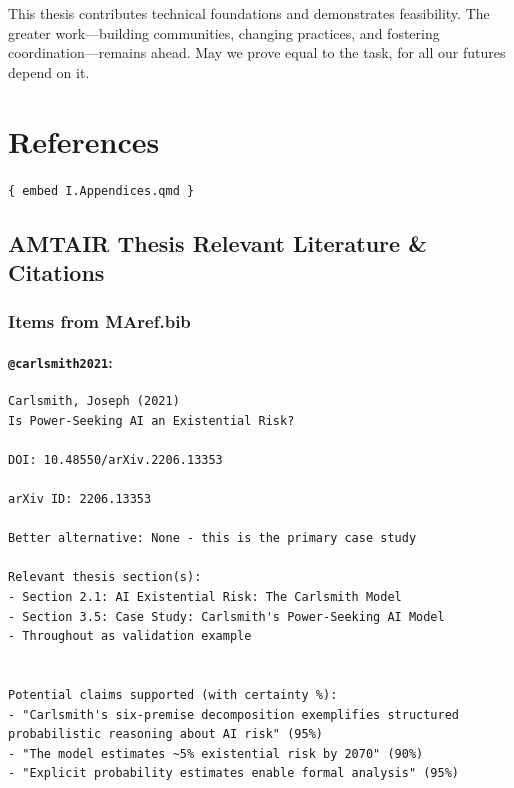 \documentclass[
  11pt,
  letterpaper,
]{book}
\begin{document}
This thesis contributes technical foundations and demonstrates
feasibility. The greater work---building communities, changing
practices, and fostering coordination---remains ahead. May we prove
equal to the task, for all our futures depend on it.


\chapter*{References}\label{sec-references}


\texttt{\{\ embed\ I.Appendices.qmd\ \}}

\section*{AMTAIR Thesis Relevant Literature \&
Citations}\label{amtair-thesis-relevant-literature-citations}


\subsection*{Items from MAref.bib}\label{items-from-maref.bib}

\subsubsection*{\texorpdfstring{\texttt{@carlsmith2021}:
\textcite{carlsmith2021}}{@carlsmith2021: @carlsmith2021}}\label{carlsmith2021-carlsmith2021}

\begin{verbatim}
Carlsmith, Joseph (2021)
Is Power-Seeking AI an Existential Risk?

DOI: 10.48550/arXiv.2206.13353

arXiv ID: 2206.13353

Better alternative: None - this is the primary case study

Relevant thesis section(s): 
- Section 2.1: AI Existential Risk: The Carlsmith Model
- Section 3.5: Case Study: Carlsmith's Power-Seeking AI Model
- Throughout as validation example


Potential claims supported (with certainty %):
- "Carlsmith's six-premise decomposition exemplifies structured probabilistic reasoning about AI risk" (95%)
- "The model estimates ~5% existential risk by 2070" (90%)
- "Explicit probability estimates enable formal analysis" (95%)
\end{verbatim}
\end{document}
